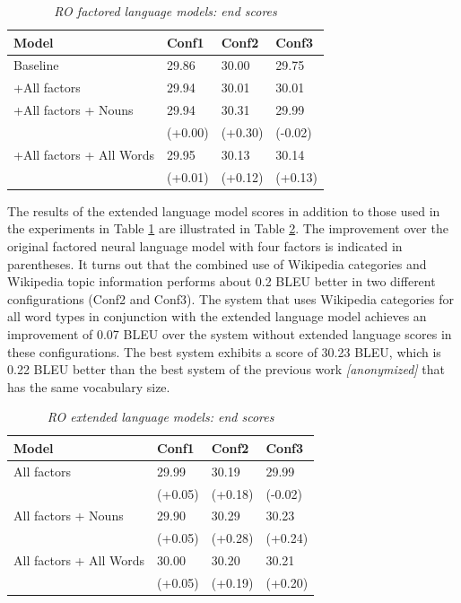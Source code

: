 \documentclass[a4paper]{article}
\newcommand{\anony}[1]{\textit{[anonymized]}}
\begin{document}
\begin{table}
\caption{\it RO factored language models: end scores}
\vspace{2mm}
\centering
  \begin{tabular}{llll}
  	\hline
  	Model                    & Conf1   & Conf2   & Conf3   \\ \hline\hline
  	Baseline                 & 29.86   & 30.00   & 29.75   \\
  	+All factors             & 29.94   & 30.01   & 30.01   \\ \hline
  	+All factors + Nouns     & 29.94   & 30.31   & 29.99   \\
  	                         & (+0.00) & (+0.30) & (-0.02) \\
  	+All factors + All Words & 29.95   & 30.13   & 30.14   \\
  	                         & (+0.01) & (+0.12) & (+0.13)
  \end{tabular}
  \label{tb:ro-factored-combi}
\end{table}

The results of the extended language model scores in addition to those used in the experiments in Table \ref{tb:ro-factored-combi} are illustrated in Table \ref{tb:ro-extended}. The improvement over the original factored neural language model with four factors is indicated in parentheses. It turns out that the combined use of Wikipedia categories and Wikipedia topic information performs about 0.2 BLEU better in two different configurations (Conf2 and Conf3). The system that uses Wikipedia categories for all word types in conjunction with the extended language model achieves an improvement of 0.07 BLEU over the system without extended language scores in these configurations.
The best system exhibits a score of 30.23 BLEU, which is 0.22 BLEU better than the best system of the previous work \anony{\cite{niehuesusing}} that has the same vocabulary size.

\begin{table}
\caption{\it RO extended language models: end scores}
\vspace{2mm}
\centering
  \begin{tabular}{llll}
  	\hline
  	Model                   & Conf1   & Conf2   & Conf3   \\ \hline\hline
  	All factors             & 29.99   & 30.19   & 29.99   \\
  	                        & (+0.05) & (+0.18) & (-0.02) \\
  	All factors + Nouns     & 29.90   & 30.29   & 30.23   \\
  	                        & (+0.05) & (+0.28) & (+0.24) \\
  	All factors + All Words & 30.00   & 30.20   & 30.21   \\
  	                        & (+0.05) & (+0.19) & (+0.20)
  \end{tabular}
  \label{tb:ro-extended}
\end{table}
\end{document}
